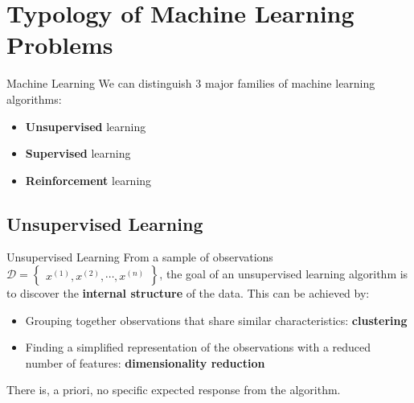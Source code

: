 \section[Typology]{Typology of Machine Learning Problems}

\begin{frame}{Machine Learning}
	We can distinguish 3 major families of machine learning algorithms:
	\begin{itemize}
		\item \textbf{Unsupervised} learning
		\item \textbf{Supervised} learning
		\item \textbf{Reinforcement} learning
	\end{itemize}
\end{frame}

\subsection[Unsupervised Learning]{Unsupervised Learning}

\begin{frame}{Unsupervised Learning}
	From a sample of observations $\mathcal{D} = \begin{Bmatrix}x^{(1)}, x^{(2)}, \cdots, x^{(n)}\end{Bmatrix}$, the goal of an unsupervised learning algorithm is to discover the \textbf{internal structure} of the data. This can be achieved by:
	
	\begin{itemize}
		\item Grouping together observations that share similar characteristics: \textbf{clustering}
		\item Finding a simplified representation of the observations with a reduced number of features: \textbf{dimensionality reduction}
	\end{itemize}
	\vspace{0.5cm}
	There is, a priori, no specific expected response from the algorithm.
	
\end{frame}

